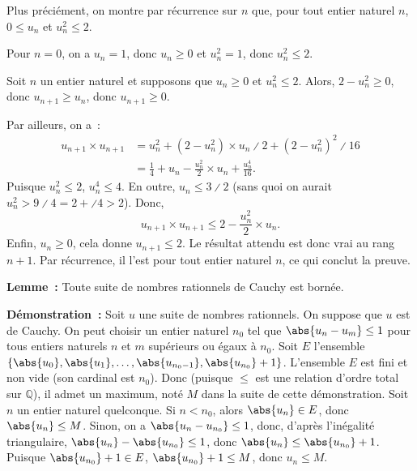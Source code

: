 \begin{tcolorbox}
    Plus préciément, on montre par récurrence sur $n$ que, pour tout entier naturel $n$, $0 \leq u_n$ et $u_n^2 \leq 2$.
    
    \medskip

    Pour $n = 0$, on a $u_n = 1$, donc $u_n \geq 0$ et $u_n^2 = 1$, donc $u_n^2 \leq 2$. 

    Soit $n$ un entier naturel et supposons que $u_n \geq 0$ et $u_n^2 \leq 2$. 
    Alors, $2 - u_n^2 \geq 0$, donc $u_{n+1} \geq u_n$, donc $u_{n+1} \geq 0$.
    
    Par ailleurs, on a : 
    \begin{equation*} \begin{aligned}
        u_{n+1} \times u_{n+1} 
         & = u_n^2 + \left(2 - u_n^2 \right) \times u_n \divslash 2 + \left(2 - u_n^2 \right)^2 \divslash 16 \\
         & = \frac{1}{4} + u_n - \frac{u_n^2}{2} \times u_n + \frac{u_n^4}{16} .
    \end{aligned}\end{equation*}
    Puisque $u_n^2 \leq 2$, $u_n^4 \leq 4$.
    En outre, $u_n \leq 3 \divslash 2$ (sans quoi on aurait $u_n^2 > 9 \divslash 4 = 2 + \divslash 4 > 2$).
    Donc, 
    \begin{equation*}
        u_{n+1} \times u_{n+1} \leq 2 - \frac{u_n^2}{2} \times u_n.
    \end{equation*}
    Enfin, $u_n \geq 0$, cela donne $u_{n+1} \leq 2$.
    Le résultat attendu est donc vrai au rang $n+1$.
    Par récurrence, il l'est pour tout entier naturel $n$, ce qui conclut la preuve.
\end{tcolorbox}

\medskip

\noindent\textbf{Lemme :} Toute suite de nombres rationnels de Cauchy est bornée. 

\medskip

\noindent\textbf{Démonstration :} 
    Soit $u$ une suite de nombres rationnels. 
    On suppose que $u$ est de Cauchy. 
    On peut choisir un entier naturel $n_0$ tel que $\abs{u_n - u_m} \leq 1$ pour tous entiers naturels $n$ et $m$ supérieurs ou égaux à $n_0$. 
    Soit $E$ l'ensemble $\lbrace \abs{u_0}, \abs{u_1}, \dots, \abs{u_{n_0 - 1}}, \abs{u_{n_0}} + 1 \rbrace$. 
    L'ensemble $E$ est fini et non vide (son cardinal est $n_0$). Donc (puisque $\leq$ est une relation d'ordre total sur $\mathbb{Q}$), il admet un maximum, noté $M$ dans la suite de cette démonstration.
    Soit $n$ un entier naturel quelconque. 
    Si $n < n_0$, alors $\abs{u_n} \in E$, donc $\abs{u_n} \leq M$.
    Sinon, on a $\abs{u_n - u_{n_0}} \leq 1$, donc, d'après l'inégalité triangulaire, $\abs{u_n} - \abs{u_{n_0}} \leq 1$, donc $\abs{u_n} \leq \abs{u_{n_0}} + 1$.
    Puisque $\abs{u_{n_0}} + 1 \in E$, $\abs{u_{n_0}} + 1 \leq M$, donc $u_n \leq M$. 

